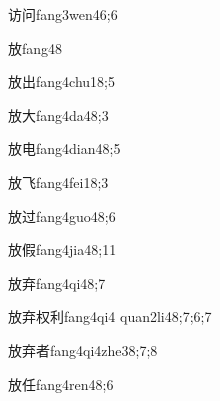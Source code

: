 \begin{verbete}{访问}{fang3wen4}{6;6}
\end{verbete}

\begin{verbete}{放}{fang4}{8}
\end{verbete}

\begin{verbete}{放出}{fang4chu1}{8;5}
\end{verbete}

\begin{verbete}{放大}{fang4da4}{8;3}
\end{verbete}

\begin{verbete}{放电}{fang4dian4}{8;5}
\end{verbete}

\begin{verbete}{放飞}{fang4fei1}{8;3}
\end{verbete}

\begin{verbete}{放过}{fang4guo4}{8;6}
\end{verbete}

\begin{verbete}{放假}{fang4jia4}{8;11}
\end{verbete}

\begin{verbete}{放弃}{fang4qi4}{8;7}
\end{verbete}

\begin{verbete}{放弃权利}{fang4qi4 quan2li4}{8;7;6;7}
\end{verbete}

\begin{verbete}{放弃者}{fang4qi4zhe3}{8;7;8}
\end{verbete}

\begin{verbete}{放任}{fang4ren4}{8;6}
\end{verbete}

